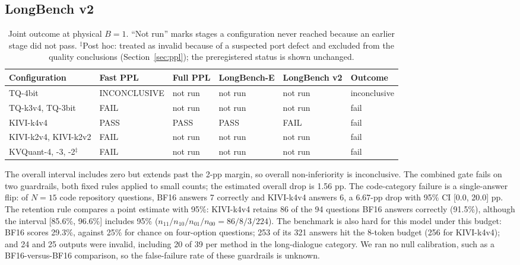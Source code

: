 \documentclass{article}
\begin{document}
\subsection{LongBench v2}
\label{sec:lbv2}

\begin{table}[t]
\caption{Joint outcome at physical $B = 1$.
``Not run'' marks stages a configuration never reached because an earlier stage did not pass.
$^{\ddagger}$Post hoc: treated as invalid because of a suspected port defect and excluded from the quality conclusions (Section~\ref{sec:ppl}); the preregistered status is shown unchanged.}
\label{tab:joint}
\vskip 0.1in
\centering
\small
\begin{tabular}{@{}llllll@{}}
\toprule
Configuration & Fast PPL & Full PPL & LongBench-E & LongBench v2 & Outcome \\
\midrule
TQ-4bit & INCONCLUSIVE & not run & not run & not run & inconclusive \\
TQ-k3v4, TQ-3bit & FAIL & not run & not run & not run & fail \\
KIVI-k4v4 & PASS & PASS & PASS & FAIL & fail \\
KIVI-k2v4, KIVI-k2v2 & FAIL & not run & not run & not run & fail \\
KVQuant-4, -3, -2$^{\ddagger}$ & FAIL & not run & not run & not run & fail \\
\bottomrule
\end{tabular}
\end{table}

The overall interval includes zero but extends past the 2-pp margin, so overall non-inferiority is inconclusive.
The combined gate fails on two guardrails, both fixed rules applied to small counts; the estimated overall drop is 1.56 pp.
The code-category failure is a single-answer flip: of $N = 15$ code repository questions, BF16 answers 7 correctly and KIVI-k4v4 answers 6, a 6.67-pp drop with 95\% CI [0.0, 20.0] pp.
The retention rule compares a point estimate with 95\%: KIVI-k4v4 retains 86 of the 94 questions BF16 answers correctly (91.5\%), although the interval [85.6\%, 96.6\%] includes 95\% ($n_{11}/n_{10}/n_{01}/n_{00} = 86/8/3/224$).
The benchmark is also hard for this model under this budget: BF16 scores 29.3\%, against 25\% for chance on four-option questions; 253 of its 321 answers hit the 8-token budget (256 for KIVI-k4v4); and 24 and 25 outputs were invalid, including 20 of 39 per method in the long-dialogue category.
We ran no null calibration, such as a BF16-versus-BF16 comparison, so the false-failure rate of these guardrails is unknown.
\end{document}
